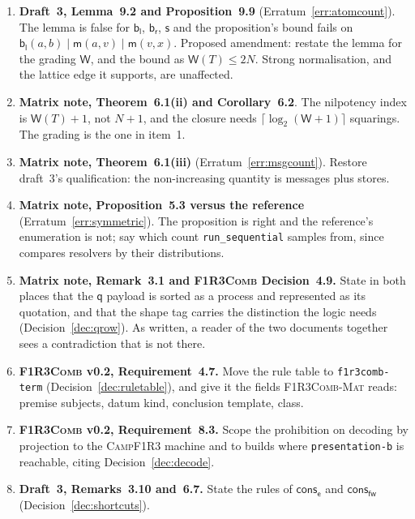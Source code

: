 \documentclass[11pt,a4paper]{article}
\newcommand{\code}[1]{\texttt{#1}}
\newcommand{\Comb}{\textsc{F1R3Comb}}
\newcommand{\Mat}{\textsc{F1R3Comb-Mat}}
\newcommand{\Camp}{\textsc{CampF1R3}}
\newcommand{\mm}{\mathsf{m}}
\newcommand{\fw}{\mathsf{fw}}
\newcommand{\bl}{\mathsf{b}_{\mathsf{l}}}
\newcommand{\br}{\mathsf{b}_{\mathsf{r}}}
\newcommand{\sy}{\mathsf{s}}
\newcommand{\ev}{\mathsf{e}}
\newcommand{\qq}{\mathsf{q}}
\newcommand{\conse}{\mathsf{cons}_{\ev}}
\newcommand{\consf}{\mathsf{cons}_{\fw}}
\newcommand{\Wt}{\mathsf{W}}
\theoremstyle{definition}
\theoremstyle{plain}
\begin{document}
\begin{enumerate}[leftmargin=1.8em]

\item \textbf{Draft~3, Lemma~9.2 and Proposition~9.9}
(Erratum~\ref{err:atomcount}). The lemma is false for $\bl$, $\br$, $\sy$ and
the proposition's bound fails on $\bl(a,b) \mid \mm(a,v) \mid \mm(v,x)$.
Proposed amendment: restate the lemma for the grading $\Wt$, and the bound as
$\Wt(T) \le 2N$. Strong normalisation, and the lattice edge it supports, are
unaffected.

\item \textbf{Matrix note, Theorem~6.1(ii) and Corollary~6.2}. The
nilpotency index is $\Wt(T)+1$, not $N+1$, and the closure needs
$\lceil \log_{2}(\Wt+1) \rceil$ squarings. The grading is the one in
item~1.

\item \textbf{Matrix note, Theorem~6.1(iii)} (Erratum~\ref{err:msgcount}).
Restore draft~3's qualification: the non-increasing quantity is messages plus
stores.

\item \textbf{Matrix note, Proposition~5.3 versus the reference}
(Erratum~\ref{err:symmetric}). The proposition is right and the reference's
enumeration is not; say which count \code{run\_sequential} samples from, since
\cite[Obl.~13.1]{matnote} compares resolvers by their distributions.

\item \textbf{Matrix note, Remark~3.1 and \Comb{} Decision~4.9.} State in
both places that the $\qq$ payload is sorted as a process and represented as
its quotation, and that the shape tag carries the distinction the logic
needs (Decision~\ref{dec:qrow}). As written, a reader of the two documents
together sees a contradiction that is not there.

\item \textbf{\Comb{} v0.2, Requirement~4.7.} Move the rule table to
\code{f1r3comb-term} (Decision~\ref{dec:ruletable}), and give it the fields
\Mat{} reads: premise subjects, datum kind, conclusion template, class.

\item \textbf{\Comb{} v0.2, Requirement~8.3.} Scope the prohibition on
decoding by projection to the \Camp{} machine and to builds where
\code{presentation-b} is reachable, citing Decision~\ref{dec:decode}.

\item \textbf{Draft~3, Remarks~3.10 and~6.7.} State the rules of $\conse$ and
$\consf$ (Decision~\ref{dec:shortcuts}).


\end{enumerate}
\end{document}
